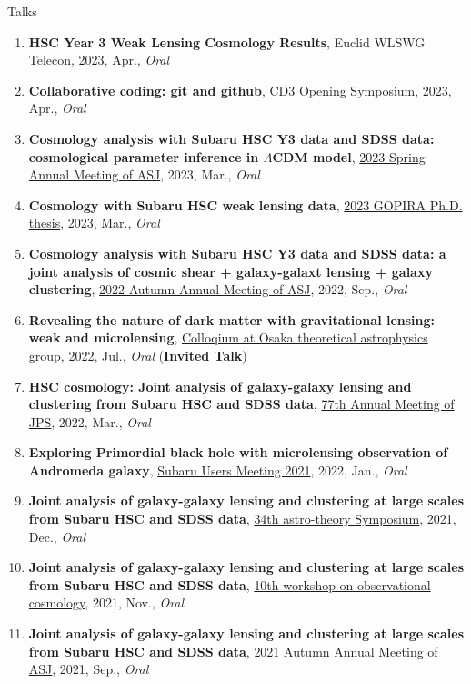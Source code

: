 \begin{rSection}{Talks}
\begin{enumerate}[itemsep=0pt, parsep=0pt, topsep=0pt, partopsep=0pt]
\item \textbf{HSC Year 3 Weak Lensing Cosmology Results}, Euclid WLSWG Telecon, 2023, Apr., \textit{Oral}
\item \textbf{Collaborative coding: git and github}, \href{https://cd3.ipmu.jp/opening/}{CD3 Opening Symposium}, 2023, Apr., \textit{Oral}
\item \textbf{Cosmology analysis with Subaru HSC Y3 data and SDSS data: cosmological parameter inference in $\Lambda$CDM model}, \href{https://www.asj.or.jp/nenkai/archive/2023a/pdf/U20a.pdf}{2023 Spring Annual Meeting of ASJ}, 2023, Mar., \textit{Oral}
\item \textbf{Cosmology with Subaru HSC weak lensing data}, \href{http://gopira.jp/Dthesis2022/program.html}{2023 GOPIRA Ph.D. thesis}, 2023, Mar., \textit{Oral}
\item \textbf{Cosmology analysis with Subaru HSC Y3 data and SDSS data: a joint analysis of cosmic shear + galaxy-galaxt lensing + galaxy clustering}, \href{https://www.asj.or.jp/nenkai/archive/2022b/pdf/U15a.pdf}{2022 Autumn Annual Meeting of ASJ}, 2022, Sep., \textit{Oral}
\item \textbf{Revealing the nature of dark matter with gravitational lensing: weak and microlensing}, \href{http://astro-osaka.jp/OUTAP/colloquium-abstracts.html#sugiyama}{Colloqium at Osaka theoretical astrophysics group}, 2022, Jul., \textit{Oral} (\textbf{Invited Talk})
\item \textbf{HSC cosmology: Joint analysis of galaxy-galaxy lensing and clustering from Subaru HSC and SDSS data}, \href{https://www.jps.or.jp/activities/meetings/annual/annual-index.php}{77th Annual Meeting of JPS}, 2022, Mar., \textit{Oral}
\item \textbf{Exploring Primordial black hole with microlensing observation of Andromeda galaxy}, \href{https://subarutelescope.org/Science/SubaruUM/SubaruUM2021/}{Subaru Users Meeting 2021}, 2022, Jan., \textit{Oral}
\item \textbf{Joint analysis of galaxy-galaxy lensing and clustering at large scales from Subaru HSC and SDSS data}, \href{https://sites.google.com/view/rironkon2021/}{34th astro-theory Symposium}, 2021, Dec., \textit{Oral}
\item \textbf{Joint analysis of galaxy-galaxy lensing and clustering at large scales from Subaru HSC and SDSS data}, \href{https://sites.google.com/view/obscosmws2021main}{10th workshop on observational cosmology}, 2021, Nov., \textit{Oral}
\item \textbf{Joint analysis of galaxy-galaxy lensing and clustering at large scales from Subaru HSC and SDSS data}, \href{https://www.asj.or.jp/nenkai/archive/2021b/pdf/U05a.pdf}{2021 Autumn Annual Meeting of ASJ}, 2021, Sep., \textit{Oral}

\end{enumerate}
\end{rSection}
